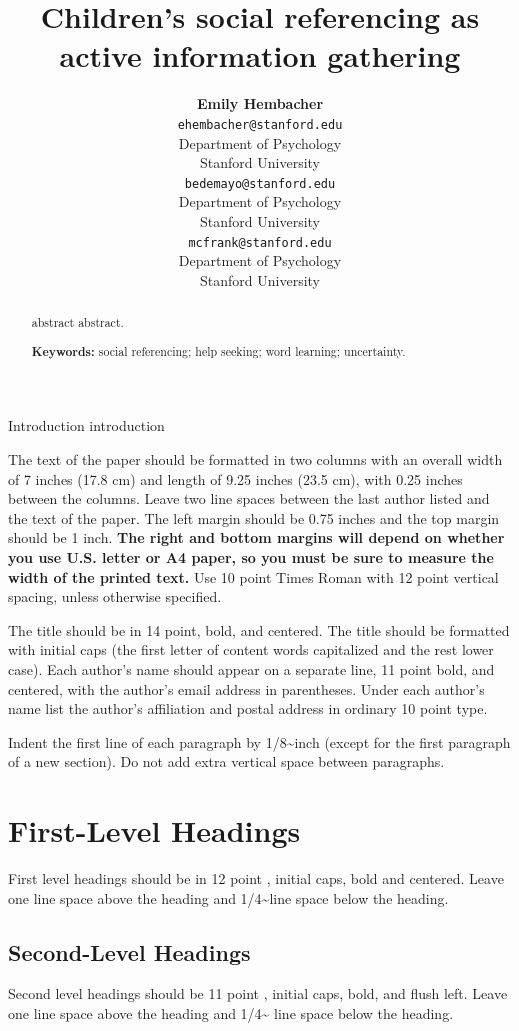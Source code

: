 \documentclass[10pt, letterpaper]{article}
\title{Children's social referencing as active information gathering}
\author{{\large \bf Emily  Hembacher} \\ \texttt{ehembacher@stanford.edu} \\ Department of Psychology \\ Stanford University \And {\large \bf Benjamin deMayo} \\ \texttt{bedemayo@stanford.edu} \\ Department of Psychology \\ Stanford University \And {\large \bf Michael C. Frank} \\ \texttt{mcfrank@stanford.edu} \\ Department of Psychology \\ Stanford University}
\begin{document}
\maketitle

\begin{abstract}
abstract abstract.

\textbf{Keywords:}
social referencing; help seeking; word learning; uncertainty.
\end{abstract}

Introduction introduction

The text of the paper should be formatted in two columns with an overall
width of 7 inches (17.8 cm) and length of 9.25 inches (23.5 cm), with
0.25 inches between the columns. Leave two line spaces between the last
author listed and the text of the paper. The left margin should be 0.75
inches and the top margin should be 1 inch.
\textbf{The right and bottom margins will depend on whether you use
U.S. letter or A4 paper, so you must be sure to measure the width of
the printed text.} Use 10 point Times Roman with 12 point vertical
spacing, unless otherwise specified.

The title should be in 14 point, bold, and centered. The title should be
formatted with initial caps (the first letter of content words
capitalized and the rest lower case). Each author's name should appear
on a separate line, 11 point bold, and centered, with the author's email
address in parentheses. Under each author's name list the author's
affiliation and postal address in ordinary 10 point type.

Indent the first line of each paragraph by 1/8\textasciitilde{}inch
(except for the first paragraph of a new section). Do not add extra
vertical space between paragraphs.

\section{First-Level Headings}\label{first-level-headings}

First level headings should be in 12 point , initial caps, bold and
centered. Leave one line space above the heading and
1/4\textasciitilde{}line space below the heading.

\subsection{Second-Level Headings}\label{second-level-headings}

Second level headings should be 11 point , initial caps, bold, and flush
left. Leave one line space above the heading and 1/4\textasciitilde{}
line space below the heading.
\end{document}

